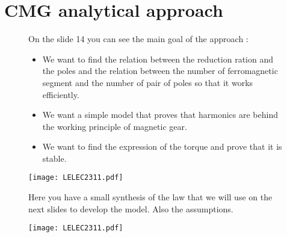 \section{CMG analytical approach}

\begin{figure}[H]
    \begin{minipage}{.45\linewidth}
        \centering
         On the slide 14 you can see the main goal of the approach :
         \begin{itemize}
             \item We want to find the relation between the reduction ration and the poles and the relation between the number of ferromagnetic segment and the number of pair of poles so that it works efficiently.
             \item We want a simple model that proves that harmonics are behind the working principle of magnetic gear.
             \item We want to find the expression of the torque and prove that it is stable.
         \end{itemize}
    \end{minipage}
    \hfill%
    \begin{minipage}[c]{.45\linewidth}
        \centering
        \texttt{[image: LELEC2311.pdf]}
    \end{minipage}
\end{figure}

\begin{figure}[H]
    \begin{minipage}{.45\linewidth}
        Here you have a small synthesis of the law that we will use on the next slides to develop the model. Also the assumptions.
    \end{minipage}
    \hfill%
    \begin{minipage}[c]{.45\linewidth}
        \centering
        \texttt{[image: LELEC2311.pdf]}
    \end{minipage}
\end{figure}


